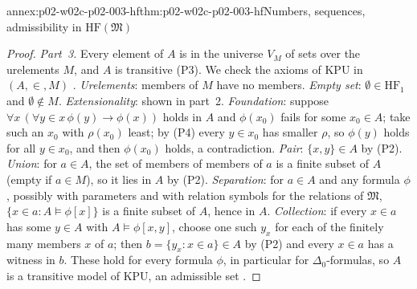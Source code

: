 \begin{annexitem}{annex:p02-w02c-p02-003-hf}{thm:p02-w02c-p02-003-hf}{Numbers, sequences, admissibility in \(\mathrm{HF}(\mathfrak M)\)}
\begin{proof}
\emph{Part~3.}  Every element of \(A\) is in the universe \(V_M\) of sets
over the urelements \(M\), and \(A\) is transitive (P3).  We check the
axioms of \(\mathrm{KPU}\) in \((A,\in,M)\)
\cite[ch.~A.7, \S2, 2.3, p.~239]{Makkai1977}.  \emph{Urelements}: members
of \(M\) have no members.  \emph{Empty set}: \(\emptyset\in\mathrm{HF}_1\)
and \(\emptyset\notin M\).  \emph{Extensionality}: shown in part~2.
\emph{Foundation}: suppose \(\forall x\,(\forall y\in x\,\phi(y)\to\phi(x))\)
holds in \(A\) and \(\phi(x_0)\) fails for some \(x_0\in A\); take such an
\(x_0\) with \(\rho(x_0)\) least; by (P4) every \(y\in x_0\) has smaller
\(\rho\), so \(\phi(y)\) holds for all \(y\in x_0\), and then \(\phi(x_0)\)
holds, a contradiction.  \emph{Pair}: \(\{x,y\}\in A\) by (P2).
\emph{Union}: for \(a\in A\), the set of members of members of \(a\) is a
finite subset of \(A\) (empty if \(a\in M\)), so it lies in \(A\) by (P2).
\emph{Separation}: for \(a\in A\) and any formula \(\phi\), possibly with
parameters and with relation symbols for the relations of \(\mathfrak M\),
\(\{x\in a:A\models\phi[x]\}\) is a finite subset of \(A\), hence in \(A\).
\emph{Collection}: if every \(x\in a\) has some \(y\in A\) with
\(A\models\phi[x,y]\), choose one such \(y_x\) for each of the finitely many
members \(x\) of \(a\); then \(b=\{y_x:x\in a\}\in A\) by (P2) and every
\(x\in a\) has a witness in \(b\).  These hold for every formula \(\phi\),
in particular for \(\Delta_0\)-formulas, so \(A\) is a transitive model of
\(\mathrm{KPU}\), an admissible set
\cite[ch.~A.7, \S2, 2.4, p.~239]{Makkai1977}.
\end{proof}
\end{annexitem}

